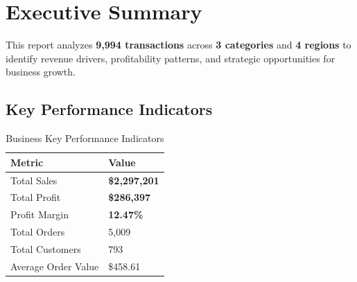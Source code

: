\documentclass[11pt,a4paper]{article}
\begin{document}
\begin{titlepage}
\begin{center}
        \vfill
        
        \begin{center}
        \end{center}
        
        \vspace{1cm}
    \end{center}
\end{titlepage}

\newpage
\renewcommand{\contentsname}{\color{primary}\Large\bfseries Table of Contents}
\tableofcontents
\newpage

\section{Executive Summary}

\begin{tcolorbox}[
    colback=accent!5,
    colframe=accent!40,
    arc=8pt,
    left=15pt,
    right=15pt,
    top=12pt,
    bottom=12pt
]
This report analyzes \textbf{9,994 transactions} across \textbf{3 categories} and \textbf{4 regions} to identify revenue drivers, profitability patterns, and strategic opportunities for business growth.
\end{tcolorbox}

\vspace{12pt}

\subsection{Key Performance Indicators}

\begin{table}[H]
\centering
\begin{tabular}{@{}p{5cm} p{5cm}@{}}
\toprule
\rowcolor{primary!10}
\textbf{Metric} & \textbf{Value} \\
\midrule
Total Sales & \textbf{\$2,297,201} \\
Total Profit & \textbf{\$286,397} \\
Profit Margin & \textbf{12.47\%} \\
Total Orders & 5,009 \\
Total Customers & 793 \\
Average Order Value & \$458.61 \\
\bottomrule
\end{tabular}
\caption{Business Key Performance Indicators}
\end{table}
\end{document}
